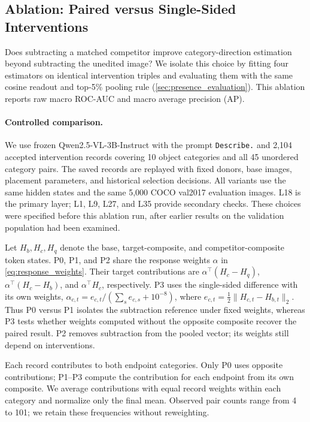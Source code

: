\subsection{Ablation: Paired versus Single-Sided Interventions}
\label{sec:paired_ablation}

Does subtracting a matched competitor improve category-direction estimation
beyond subtracting the unedited image? We isolate this choice by fitting four
estimators on identical intervention triples and evaluating them with the
same cosine readout and top-5\% pooling rule
(\cref{sec:presence_evaluation}). This ablation reports raw macro ROC-AUC
and macro average precision (AP).

\paragraph{Controlled comparison.}
We use frozen Qwen2.5-VL-3B-Instruct with the prompt \texttt{Describe.}
and 2,104 accepted intervention records covering 10 object categories and
all 45 unordered category pairs. The saved records are replayed with fixed
donors, base images, placement parameters, and historical selection
decisions. All variants use the same hidden states and the same 5,000
COCO val2017 evaluation images. L18 is the primary layer; L1, L9, L27,
and L35 provide secondary checks. These choices were specified before this
ablation run, after earlier results on the validation population had been
examined.

Let \(H_b,H_c,H_q\) denote the base, target-composite, and
competitor-composite token states. P0, P1, and P2 share the response weights
\(\alpha\) in \cref{eq:response_weights}. Their target contributions are
\(\alpha^\top(H_c-H_q)\), \(\alpha^\top(H_c-H_b)\), and
\(\alpha^\top H_c\), respectively. P3 uses the single-sided difference
with its own weights,
\(\alpha_{c,t}=e_{c,t}/(\sum_s e_{c,s}+10^{-8})\), where
\(e_{c,t}=\tfrac12\|H_{c,t}-H_{b,t}\|_2\).
Thus P0 versus P1 isolates the subtraction reference under fixed weights,
whereas P3 tests whether weights computed without the opposite composite
recover the paired result. P2 removes subtraction from the pooled vector;
its weights still depend on interventions.

Each record contributes to both endpoint categories. Only P0 uses opposite
contributions; P1--P3 compute the contribution for each endpoint from its
own composite. We average contributions with equal record weights within
each category and normalize only the final mean. Observed pair counts
range from 4 to 101; we retain these frequencies without reweighting.

